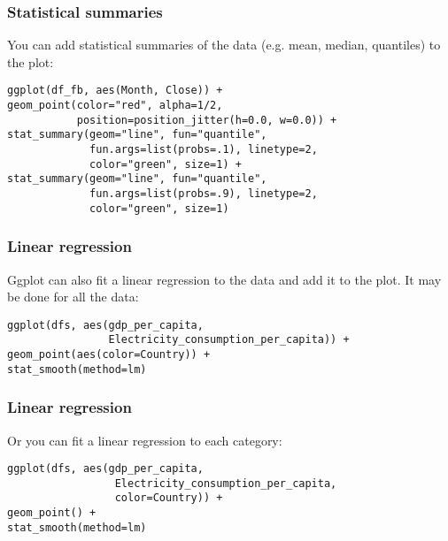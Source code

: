 \documentclass{beamer}
\begin{document}
	\begin{frame}[fragile]
		\frametitle{Statistical summaries}

		You can add statistical summaries of the data (e.g. mean, median, quantiles) to the plot:

		\vspace{2em}
	
		\begin{exampleblock}{}
		\begin{BVerbatim}
ggplot(df_fb, aes(Month, Close)) + 
geom_point(color="red", alpha=1/2,
           position=position_jitter(h=0.0, w=0.0)) +
stat_summary(geom="line", fun="quantile",
             fun.args=list(probs=.1), linetype=2,
             color="green", size=1) +
stat_summary(geom="line", fun="quantile",
             fun.args=list(probs=.9), linetype=2,
             color="green", size=1)
		\end{BVerbatim}
		\end{exampleblock}{}

	\end{frame}

	\begin{frame}[fragile]
		\frametitle{Linear regression}

		Ggplot can also fit a linear regression to the data and add it to the plot. It may be done for all the data:

		\vspace{2em}
	
		\begin{exampleblock}{}
		\begin{BVerbatim}
ggplot(dfs, aes(gdp_per_capita,
                Electricity_consumption_per_capita)) +
geom_point(aes(color=Country)) +
stat_smooth(method=lm)
		\end{BVerbatim}
		\end{exampleblock}{}

	\end{frame}

	\begin{frame}[fragile]
		\frametitle{Linear regression}

		Or you can fit a linear regression to each category:

		\vspace{2em}
	
		\begin{exampleblock}{}
		\begin{BVerbatim}
ggplot(dfs, aes(gdp_per_capita,
                 Electricity_consumption_per_capita,
                 color=Country)) +
geom_point() +
stat_smooth(method=lm)
		\end{BVerbatim}
		\end{exampleblock}{}

	\end{frame}
\end{document}
